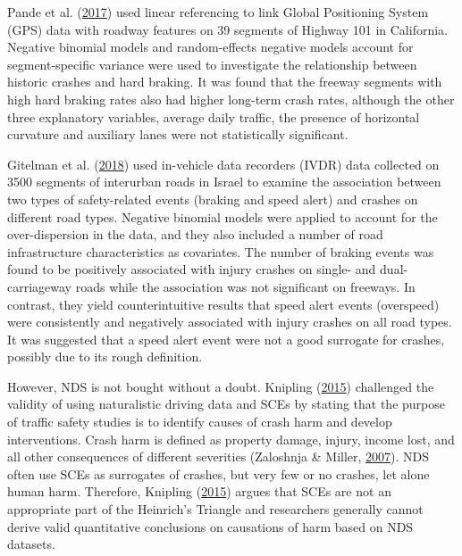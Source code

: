 \documentclass[12pt]{book}
\numberwithin{equation}{chapter}
\begin{document}
Pande et al. (\protect\hyperlink{ref-pande2017preliminary}{2017}) used linear referencing to link Global Positioning System (GPS) data with roadway features on 39 segments of Highway 101 in California. Negative binomial models and random-effects negative models account for segment-specific variance were used to investigate the relationship between historic crashes and hard braking. It was found that the freeway segments with high hard braking rates also had higher long-term crash rates, although the other three explanatory variables, average daily traffic, the presence of horizontal curvature and auxiliary lanes were not statistically significant.

Gitelman et al. (\protect\hyperlink{ref-gitelman2018exploring}{2018}) used in-vehicle data recorders (IVDR) data collected on 3500 segments of interurban roads in Israel to examine the association between two types of safety-related events (braking and speed alert) and crashes on different road types. Negative binomial models were applied to account for the over-dispersion in the data, and they also included a number of road infrastructure characteristics as covariates. The number of braking events was found to be positively associated with injury crashes on single- and dual-carriageway roads while the association was not significant on freeways. In contrast, they yield counterintuitive results that speed alert events (overspeed) were consistently and negatively associated with injury crashes on all road types. It was suggested that a speed alert event were not a good surrogate for crashes, possibly due to its rough definition.

However, NDS is not bought without a doubt. Knipling (\protect\hyperlink{ref-knipling2015naturalistic}{2015}) challenged the validity of using naturalistic driving data and SCEs by stating that the purpose of traffic safety studies is to identify causes of crash harm and develop interventions. Crash harm is defined as property damage, injury, income lost, and all other consequences of different severities (Zaloshnja \& Miller, \protect\hyperlink{ref-zaloshnja2007unit}{2007}). NDS often use SCEs as surrogates of crashes, but very few or no crashes, let alone human harm. Therefore, Knipling (\protect\hyperlink{ref-knipling2015naturalistic}{2015}) argues that SCEs are not an appropriate part of the Heinrich's Triangle and researchers generally cannot derive valid quantitative conclusions on causations of harm based on NDS datasets.
\end{document}
